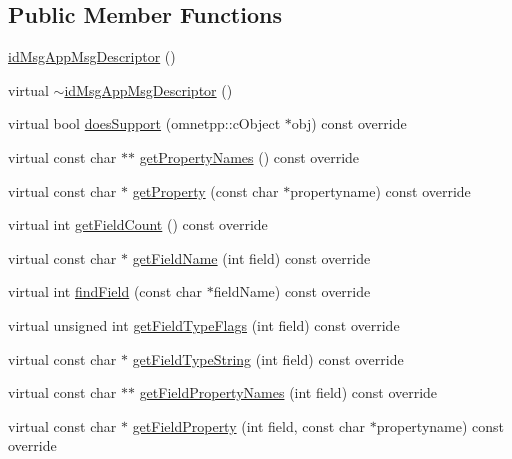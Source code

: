 \subsection*{Public Member Functions}
\begin{DoxyCompactItemize}
\item 
\hyperlink{classid_msg_app_msg_descriptor_a1f471f84ba71baffc0c0bedf29ff5522}{id\+Msg\+App\+Msg\+Descriptor} ()
\item 
virtual \hyperlink{classid_msg_app_msg_descriptor_a89b66128f3a50e738add1045dbb0e9b2}{$\sim$id\+Msg\+App\+Msg\+Descriptor} ()
\item 
virtual bool \hyperlink{classid_msg_app_msg_descriptor_ace75e5fffbe04839660617b19145128f}{does\+Support} (omnetpp\+::c\+Object $\ast$obj) const override
\item 
virtual const char $\ast$$\ast$ \hyperlink{classid_msg_app_msg_descriptor_a5da6527d679103a0cac6143a160813a7}{get\+Property\+Names} () const override
\item 
virtual const char $\ast$ \hyperlink{classid_msg_app_msg_descriptor_ac9b9240ff817b217015861a922206080}{get\+Property} (const char $\ast$propertyname) const override
\item 
virtual int \hyperlink{classid_msg_app_msg_descriptor_ae8280283eb1f21ecfa541b6e824d8008}{get\+Field\+Count} () const override
\item 
virtual const char $\ast$ \hyperlink{classid_msg_app_msg_descriptor_abc0d2c99d328bee5785de2d5df2a40e3}{get\+Field\+Name} (int field) const override
\item 
virtual int \hyperlink{classid_msg_app_msg_descriptor_a4b04258cc21a7b0c95fbb68719ac489d}{find\+Field} (const char $\ast$field\+Name) const override
\item 
virtual unsigned int \hyperlink{classid_msg_app_msg_descriptor_a9211adf741e2d9bb31f47d210297438e}{get\+Field\+Type\+Flags} (int field) const override
\item 
virtual const char $\ast$ \hyperlink{classid_msg_app_msg_descriptor_a0c976a9e1df2844d8e0897bf0eee8d5a}{get\+Field\+Type\+String} (int field) const override
\item 
virtual const char $\ast$$\ast$ \hyperlink{classid_msg_app_msg_descriptor_a55640ce6067dd59f8fc22cb8c3ce2f29}{get\+Field\+Property\+Names} (int field) const override
\item 
virtual const char $\ast$ \hyperlink{classid_msg_app_msg_descriptor_a69e69da2c64669ba7d0865a63e273e92}{get\+Field\+Property} (int field, const char $\ast$propertyname) const override

\end{DoxyCompactItemize}
